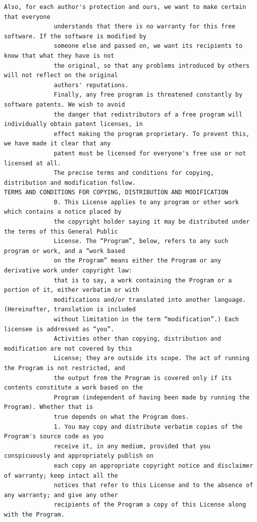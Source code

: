 \begin{lstlisting}[basicstyle=\ttfamily\scriptsize,breaklines=true]
              Also, for each author's protection and ours, we want to make certain that everyone
              understands that there is no warranty for this free software. If the software is modified by
              someone else and passed on, we want its recipients to know that what they have is not
              the original, so that any problems introduced by others will not reflect on the original
              authors' reputations.
              Finally, any free program is threatened constantly by software patents. We wish to avoid
              the danger that redistributors of a free program will individually obtain patent licenses, in
              effect making the program proprietary. To prevent this, we have made it clear that any
              patent must be licensed for everyone's free use or not licensed at all.
              The precise terms and conditions for copying, distribution and modification follow.
TERMS AND CONDITIONS FOR COPYING, DISTRIBUTION AND MODIFICATION
              0. This License applies to any program or other work which contains a notice placed by
              the copyright holder saying it may be distributed under the terms of this General Public
              License. The “Program”, below, refers to any such program or work, and a “work based
              on the Program” means either the Program or any derivative work under copyright law:
              that is to say, a work containing the Program or a portion of it, either verbatim or with
              modifications and/or translated into another language. (Hereinafter, translation is included
              without limitation in the term “modification”.) Each licensee is addressed as “you”.
              Activities other than copying, distribution and modification are not covered by this
              License; they are outside its scope. The act of running the Program is not restricted, and
              the output from the Program is covered only if its contents constitute a work based on the
              Program (independent of having been made by running the Program). Whether that is
              true depends on what the Program does.
              1. You may copy and distribute verbatim copies of the Program's source code as you
              receive it, in any medium, provided that you conspicuously and appropriately publish on
              each copy an appropriate copyright notice and disclaimer of warranty; keep intact all the
              notices that refer to this License and to the absence of any warranty; and give any other
              recipients of the Program a copy of this License along with the Program.

\end{lstlisting}

